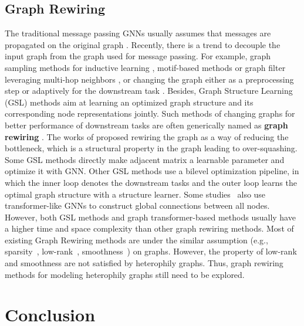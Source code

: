\documentclass[sigconf]{acmart}
\begin{document}
	\subsection{Graph Rewiring}
	The traditional message passing GNNs usually assumes that messages are propagated on the original graph \cite{GCN,GAT,GraphSAGE,GCN2}. Recently, there is a trend to decouple the input graph from the graph used for message passing.  For example,  graph sampling methods for inductive learning \cite{GraphSAGE, zhang2019bayesian},  motif-based methods \cite{monti2018motifnet} or graph filter leveraging multi-hop neighbors \cite{abu2019mixhop}, or changing the graph either as a preprocessing step \cite{klicpera2019diffusion,alon2020bottleneck} or adaptively for the downstream task \cite{kazi2022differentiable,wang2019dynamic}. Besides, Graph Structure Learning (GSL) methods \cite{li2018agcn, LDS, chen2020iterative, zhusurvey, gao2020exploring, wan2021graph} aim at learning an optimized graph structure and its corresponding node representations jointly. Such methods of changing graphs for better performance of downstream tasks are often generically named as \textbf{graph rewiring} \cite{topping2021understanding}.
	The works of \cite{alon2020bottleneck,topping2021understanding} proposed rewiring the graph as a way of reducing the bottleneck, which is a structural property in the graph leading to over-squashing.  Some GSL methods \cite{wan2021graph, gao2020exploring}  directly make adjacent matrix a learnable parameter and optimize it with GNN. Other GSL methods \cite{LDS, chen2020iterative} use a bilevel optimization pipeline, in which the inner loop denotes the downstream tasks and the outer loop learns the optimal graph structure with a structure learner. Some studies~\cite{ying2021transformers, dwivedi2021graph} also use transformer-like GNNs to construct global connections between all nodes. However, both GSL methods and graph  transformer-based methods usually have a higher time and space complexity than other graph rewiring methods. Most of existing Graph Rewiring methods are under the similar assumption (e.g., sparsity~\cite{sparse}, low-rank~\cite{lowrank}, smoothness~\cite{smooth1, smooth2}) on graphs. However, the property of low-rank and smoothness are not satisfied by heterophily graphs.  Thus, graph rewiring methods for modeling heterophily graphs still need to be explored. \section{Conclusion}
\end{document}
